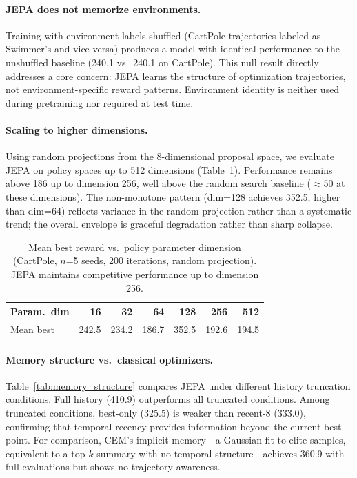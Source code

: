 \paragraph{JEPA does not memorize environments.}
Training with environment labels shuffled (CartPole trajectories
labeled as Swimmer's and vice versa) produces a model with identical
performance to the unshuffled baseline (240.1 vs.\ 240.1 on CartPole).
This null result directly addresses a core concern: JEPA learns the
structure of optimization trajectories, not environment-specific
reward patterns.
Environment identity is neither used during pretraining nor required
at test time.

\paragraph{Scaling to higher dimensions.}
Using random projections from the 8-dimensional proposal space,
we evaluate JEPA on policy spaces up to 512 dimensions
(Table~\ref{tab:scaling_laws}).
Performance remains above 186 up to dimension 256, well above
the random search baseline ($\approx$50 at these dimensions).
The non-monotone pattern (dim=128 achieves 352.5, higher than dim=64)
reflects variance in the random projection rather than a systematic
trend; the overall envelope is graceful degradation rather than
sharp collapse.

\begin{table}[t]
\centering
\caption{Mean best reward vs.\ policy parameter dimension
(CartPole, $n$=5 seeds, 200 iterations, random projection).
JEPA maintains competitive performance up to dimension 256.}
\label{tab:scaling_laws}
\begin{tabular}{lrrrrrr}
\toprule
Param.\ dim & 16 & 32 & 64 & 128 & 256 & 512 \\
\midrule
Mean best & 242.5 & 234.2 & 186.7 & 352.5 & 192.6 & 194.5 \\
\bottomrule
\end{tabular}
\end{table}

\paragraph{Memory structure vs.\ classical optimizers.}
Table~\ref{tab:memory_structure} compares JEPA under different history
truncation conditions.
Full history (410.9) outperforms all truncated conditions.
Among truncated conditions, best-only (325.5) is weaker than
recent-8 (333.0), confirming that temporal recency provides
information beyond the current best point.
For comparison, CEM's implicit memory---a Gaussian fit to elite
samples, equivalent to a top-$k$ summary with no temporal
structure---achieves 360.9 with full evaluations but shows no
trajectory awareness.


